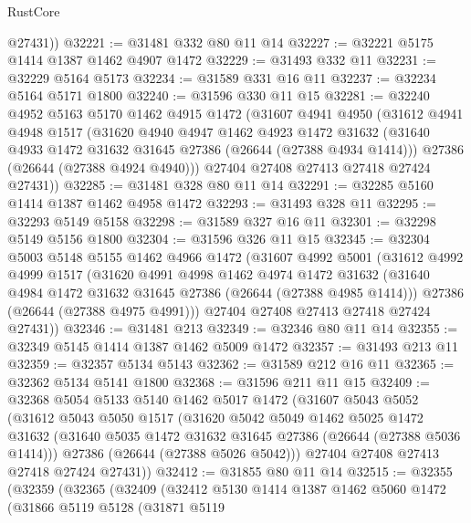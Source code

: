 \begin{lexlean}{RustCore}
\begin{coremodule}
        @27431))
@32221 := @31481 @332 @80 @11 @14
@32227 := @32221 @5175 @1414 @1387 @1462 @4907 @1472
@32229 := @31493 @332 @11
@32231 := @32229 @5164 @5173
@32234 := @31589 @331 @16 @11
@32237 := @32234 @5164 @5171 @1800
@32240 := @31596 @330 @11 @15
@32281 := @32240
    @4952
    @5163
    @5170
    @1462
    @4915
    @1472
    (@31607
      @4941
      @4950
      (@31612
        @4941
        @4948
        @1517
        (@31620
          @4940
          @4947
          @1462
          @4923
          @1472
          @31632
          (@31640 @4933 @1472 @31632 @31645 @27386 (@26644 (@27388 @4934 @1414)))
          @27386
          (@26644 (@27388 @4924 @4940)))
        @27404
        @27408
        @27413
        @27418
        @27424
        @27431))
@32285 := @31481 @328 @80 @11 @14
@32291 := @32285 @5160 @1414 @1387 @1462 @4958 @1472
@32293 := @31493 @328 @11
@32295 := @32293 @5149 @5158
@32298 := @31589 @327 @16 @11
@32301 := @32298 @5149 @5156 @1800
@32304 := @31596 @326 @11 @15
@32345 := @32304
    @5003
    @5148
    @5155
    @1462
    @4966
    @1472
    (@31607
      @4992
      @5001
      (@31612
        @4992
        @4999
        @1517
        (@31620
          @4991
          @4998
          @1462
          @4974
          @1472
          @31632
          (@31640 @4984 @1472 @31632 @31645 @27386 (@26644 (@27388 @4985 @1414)))
          @27386
          (@26644 (@27388 @4975 @4991)))
        @27404
        @27408
        @27413
        @27418
        @27424
        @27431))
@32346 := @31481 @213
@32349 := @32346 @80 @11 @14
@32355 := @32349 @5145 @1414 @1387 @1462 @5009 @1472
@32357 := @31493 @213 @11
@32359 := @32357 @5134 @5143
@32362 := @31589 @212 @16 @11
@32365 := @32362 @5134 @5141 @1800
@32368 := @31596 @211 @11 @15
@32409 := @32368
    @5054
    @5133
    @5140
    @1462
    @5017
    @1472
    (@31607
      @5043
      @5052
      (@31612
        @5043
        @5050
        @1517
        (@31620
          @5042
          @5049
          @1462
          @5025
          @1472
          @31632
          (@31640 @5035 @1472 @31632 @31645 @27386 (@26644 (@27388 @5036 @1414)))
          @27386
          (@26644 (@27388 @5026 @5042)))
        @27404
        @27408
        @27413
        @27418
        @27424
        @27431))
@32412 := @31855 @80 @11 @14
@32515 := @32355
    (@32359
      (@32365
        (@32409
          (@32412
            @5130
            @1414
            @1387
            @1462
            @5060
            @1472
            (@31866
              @5119
              @5128
              (@31871
                @5119

\end{coremodule}
\end{lexlean}
